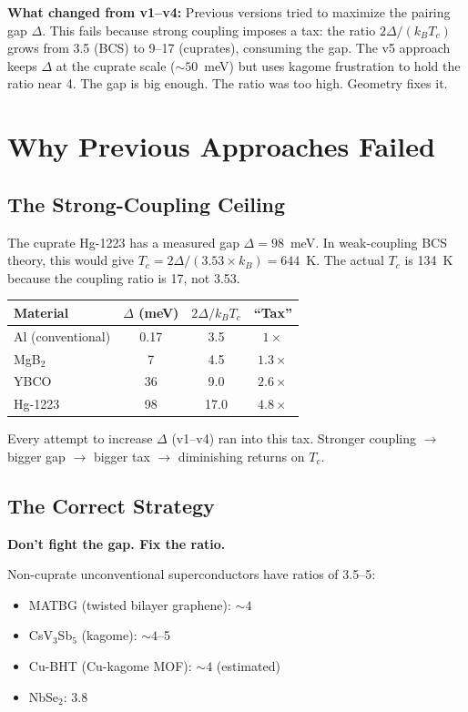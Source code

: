 \documentclass[11pt, a4paper]{article}
\begin{document}
\textbf{What changed from v1--v4:} Previous versions tried to
maximize the pairing gap $\Delta$. This fails because strong
coupling imposes a tax: the ratio $2\Delta/(k_B T_c)$ grows from
3.5 (BCS) to 9--17 (cuprates), consuming the gap. The v5 approach
keeps $\Delta$ at the cuprate scale ($\sim 50$~meV) but uses kagome
frustration to hold the ratio near 4. The gap is big enough.
The ratio was too high. Geometry fixes it.

\tableofcontents

\section{Why Previous Approaches Failed}

\subsection{The Strong-Coupling Ceiling}

The cuprate Hg-1223 has a measured gap $\Delta = 98$~meV. In
weak-coupling BCS theory, this would give
$T_c = 2\Delta/(3.53 \times k_B) = 644$~K. The actual $T_c$ is
134~K because the coupling ratio is 17, not 3.53.

\begin{center}
\begin{tabular}{@{}lccc@{}}
\toprule
\textbf{Material} & $\Delta$ (meV) & $2\Delta/k_B T_c$ &
  \textbf{``Tax''} \\
\midrule
Al (conventional) & 0.17 & 3.5 & $1\times$ \\
MgB$_2$ & 7 & 4.5 & $1.3\times$ \\
YBCO & 36 & 9.0 & $2.6\times$ \\
Hg-1223 & 98 & 17.0 & $4.8\times$ \\
\bottomrule
\end{tabular}
\end{center}

Every attempt to increase $\Delta$ (v1--v4) ran into this tax.
Stronger coupling $\to$ bigger gap $\to$ bigger tax $\to$
diminishing returns on $T_c$.

\subsection{The Correct Strategy}

\textbf{Don't fight the gap. Fix the ratio.}

Non-cuprate unconventional superconductors have ratios of 3.5--5:
\begin{itemize}[nosep]
  \item MATBG (twisted bilayer graphene): $\sim 4$
  \item CsV$_3$Sb$_5$ (kagome): $\sim 4$--5
  \item Cu-BHT (Cu-kagome MOF): $\sim 4$ (estimated)
  \item NbSe$_2$: 3.8
\end{itemize}
\end{document}
